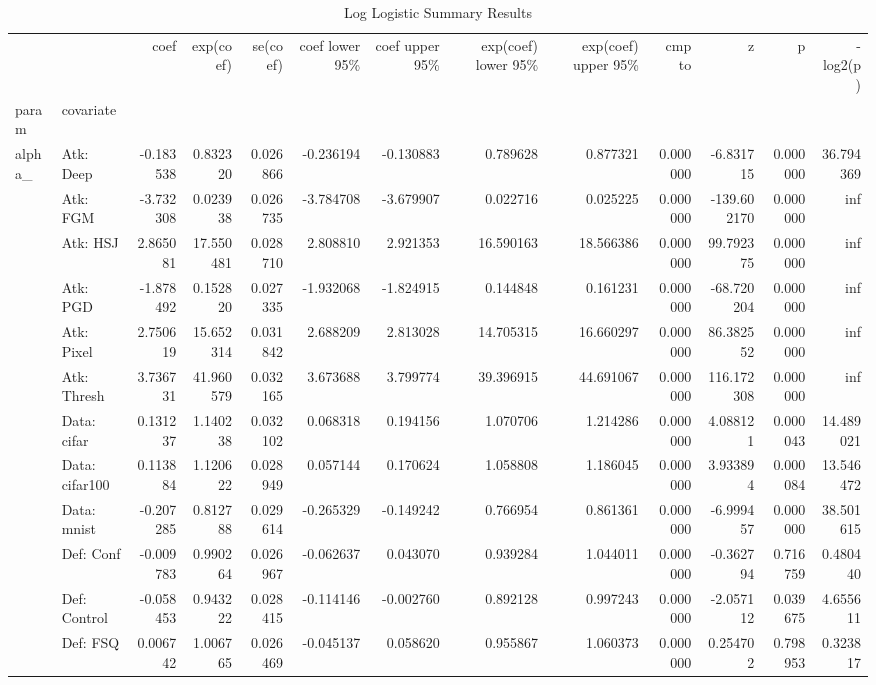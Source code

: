 \begin{table}[htbp]
\caption{Log Logistic Summary Results}
\label{tab:log_logistic_summary}
\begin{tabular}{llrrrrrrrrrrr}
\toprule
 &  & coef & exp(coef) & se(coef) & coef lower 95\% & coef upper 95\% & exp(coef) lower 95\% & exp(coef) upper 95\% & cmp to & z & p & -log2(p) \\
param & covariate &  &  &  &  &  &  &  &  &  &  &  \\
\midrule
\multirow[t]{23}{*}{alpha\_} & Atk: Deep & -0.183538 & 0.832320 & 0.026866 & -0.236194 & -0.130883 & 0.789628 & 0.877321 & 0.000000 & -6.831715 & 0.000000 & 36.794369 \\
 & Atk: FGM & -3.732308 & 0.023938 & 0.026735 & -3.784708 & -3.679907 & 0.022716 & 0.025225 & 0.000000 & -139.602170 & 0.000000 & inf \\
 & Atk: HSJ & 2.865081 & 17.550481 & 0.028710 & 2.808810 & 2.921353 & 16.590163 & 18.566386 & 0.000000 & 99.792375 & 0.000000 & inf \\
 & Atk: PGD & -1.878492 & 0.152820 & 0.027335 & -1.932068 & -1.824915 & 0.144848 & 0.161231 & 0.000000 & -68.720204 & 0.000000 & inf \\
 & Atk: Pixel & 2.750619 & 15.652314 & 0.031842 & 2.688209 & 2.813028 & 14.705315 & 16.660297 & 0.000000 & 86.382552 & 0.000000 & inf \\
 & Atk: Thresh & 3.736731 & 41.960579 & 0.032165 & 3.673688 & 3.799774 & 39.396915 & 44.691067 & 0.000000 & 116.172308 & 0.000000 & inf \\
 & Data: cifar & 0.131237 & 1.140238 & 0.032102 & 0.068318 & 0.194156 & 1.070706 & 1.214286 & 0.000000 & 4.088121 & 0.000043 & 14.489021 \\
 & Data: cifar100 & 0.113884 & 1.120622 & 0.028949 & 0.057144 & 0.170624 & 1.058808 & 1.186045 & 0.000000 & 3.933894 & 0.000084 & 13.546472 \\
 & Data: mnist & -0.207285 & 0.812788 & 0.029614 & -0.265329 & -0.149242 & 0.766954 & 0.861361 & 0.000000 & -6.999457 & 0.000000 & 38.501615 \\
 & Def: Conf & -0.009783 & 0.990264 & 0.026967 & -0.062637 & 0.043070 & 0.939284 & 1.044011 & 0.000000 & -0.362794 & 0.716759 & 0.480440 \\
 & Def: Control & -0.058453 & 0.943222 & 0.028415 & -0.114146 & -0.002760 & 0.892128 & 0.997243 & 0.000000 & -2.057112 & 0.039675 & 4.655611 \\
 & Def: FSQ & 0.006742 & 1.006765 & 0.026469 & -0.045137 & 0.058620 & 0.955867 & 1.060373 & 0.000000 & 0.254702 & 0.798953 & 0.323817 \\

\end{tabular}
\end{table}
